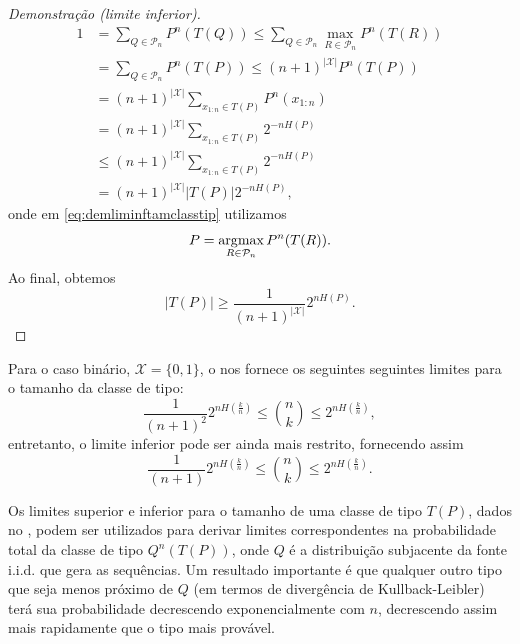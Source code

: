 \begin{proof}[Demonstração (limite inferior)]
\begin{subequations}
\begin{align}
  1 &= \sum_{Q \in \mathcal{P}_n} P^n (T(Q)) \leq \sum_{Q \in \mathcal{P}_n} \max_{R \in \mathcal{P}_n} P^n (T(R)) \\
       &= \sum_{Q \in \mathcal{P}_n} P^n (T(P)) \leq (n+1)^{\vert \mathcal{X} \vert} P^n (T(P)) \label{eq:demliminftamclasstip}\\
      &= (n+1)^{\vert \mathcal{X} \vert} \sum_{x_{1:n} \in T(P)} P^n (x_{1:n}) \\
      &= (n+1)^{\vert \mathcal{X} \vert} \sum_{x_{1:n} \in T(P)} 2^{-nH(P)} \\
      &\leq (n+1)^{\vert \mathcal{X} \vert} \sum_{x_{1:n} \in T(P)} 2^{-nH(P)} \\
      &= (n+1)^{\vert \mathcal{X} \vert} \vert T(P) \vert 2^{-nH(P)} ,
\end{align}
\end{subequations}
onde em \ref{eq:demliminftamclasstip} utilizamos
\begin{equation}
  P = \operatorname*{\arg\!\max}_{R \in \mathcal{P}_n} P^n (T(R)) .
\end{equation}
Ao final, obtemos
\begin{equation}
\vert T(P) \vert \geq \frac{1}{(n+1)^{\vert \mathcal{X} \vert}} 2^{nH(P)} .
\end{equation}
\end{proof}

Para o caso binário, $\mathcal{X} = \{0,1\}$, o 
nos fornece os seguintes seguintes limites para o tamanho da classe de tipo:
\begin{equation}
  \frac{1}{(n+1)^2} 2^{nH(\frac{k}{n})} \leq {n \choose k} \leq 2^{nH(\frac{k}{n})} ,
\end{equation}
entretanto, o limite inferior pode ser ainda mais restrito, fornecendo assim
\begin{equation}
  \frac{1}{(n+1)} 2^{nH(\frac{k}{n})} \leq {n \choose k} \leq 2^{nH(\frac{k}{n})} .
\end{equation}

Os limites superior e inferior para o tamanho de uma classe de tipo $T(P)$, dados no
, podem ser utilizados para derivar limites correspondentes na probabilidade total
da classe de tipo $Q^n(T(P))$, onde $Q$ é a distribuição subjacente da fonte i.i.d. que gera as sequências.
Um resultado importante é que qualquer outro tipo que seja menos próximo de $Q$ (em termos de divergência de Kullback-Leibler)
terá sua probabilidade decrescendo exponencialmente com $n$, decrescendo assim mais rapidamente que o tipo mais provável.

